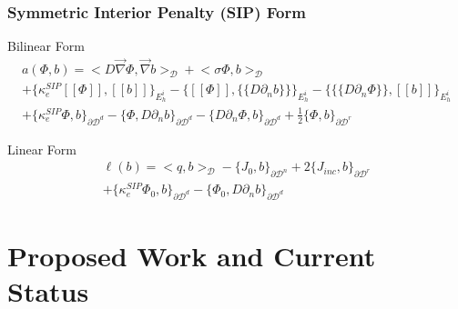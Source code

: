 \documentclass[]{beamer}
\begin{document}
\begin{frame}[t]\frametitle{Symmetric Interior Penalty (SIP) Form}
	\begin{block}{Bilinear Form}{\small
		\begin{gather*}
			 a( \Phi, b)  = \Big<  D \vec{\nabla}  \Phi , \vec{\nabla} b  \Big>_{\mathcal{D}} + \Big<  \sigma   \Phi ,  b  \Big>_{\mathcal{D}}    \\
			+  \Big\{ \kappa_e^{SIP} [\![   \Phi ]\!] , [\![  b ]\!]\Big\}_{E_h^i} - \Big\{  [\![   \Phi ]\!] , \{\!\{  D \partial_n b \}\!\}\Big\}_{E_h^i} -\Big\{ \{\!\{  D \partial_n  \Phi \}\!\} , [\![ b ]\!]\Big\}_{E_h^i} \\
			+ \Big\{ \kappa_e^{SIP}   \Phi ,   b \Big\}_{\partial \mathcal{D}^d} - \Big\{   \Phi  ,  D \partial_n b \Big\}_{\partial \mathcal{D}^d} - \Big\{   D 				\partial_n  \Phi ,   b \Big\}_{\partial \mathcal{D}^d}  +  \frac{1}{2} \Big\{    \Phi ,   b \Big\}_{\partial \mathcal{D}^r}
        	\end{gather*} }
\end{block}
\begin{block}{Linear Form}{\small
		\begin{align*}
			\ell (b) = \Big<  q, b  \Big>_{\mathcal{D}}  - \Big\{   J_{0}, b  \Big\}_{\partial \mathcal{D}^n} +  2 \Big\{   J_{inc}, b  \Big\}_{\partial 				\mathcal{D}^r} \\ + \Big\{ \kappa_e^{SIP}   \Phi_0 ,   b \Big\}_{\partial \mathcal{D}^d} - \Big\{   \Phi_0  ,  D \partial_n b \Big\}_{\partial 					\mathcal{D}^d} 
        	\end{align*} }
    \end{block}
\end{frame}
\section{Proposed Work and Current Status}
\subsection{}
\begin{frame}[t]\frametitle{}
\end{frame}
\begin{frame}[t]\frametitle{}
\end{frame}
\begin{frame}[t]\frametitle{}
\end{frame}
\begin{frame}[t]\frametitle{}
\end{frame}
\begin{frame}[t]\frametitle{}
\end{frame}
\begin{frame}[t]\frametitle{}
\end{frame}
\end{document}
